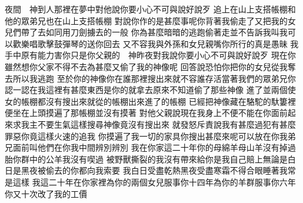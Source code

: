 夜間　神到人那裡\chientien 在夢中對他說\chientien 你要小心\chientien 不可與說好說歹\chuan 
{}追上\chientien{}在山上支搭帳棚\yuentien{}和他的眾弟兄\chientien 也在山上支搭帳棚\chuan 
{}對說\chientien 你作的是甚麼事呢\chientien 你背著我偷走了\chientien 又把我的女兒們帶了去\chientien 如同用刀劍擄去的一般\chuan 
{}你為甚麼暗暗的逃跑\chientien 偷著走\chientien 並不告訴我\chientien 叫我可以歡樂\chientien 唱歌\chientien 擊鼓\chientien 彈琴的送你回去\chuan 
{}又不容我與外孫和女兒親嘴\yuentien 你所行的真是愚昧\chuan 
{}我手中原有能力害你\chientien 只是你父親的　神昨夜對我說\chientien 你要小心\chientien 不可與說好說歹\chuan 
{}現在你雖然想你父家\chientien 不得不去\chientien 為甚麼又偷了我的神像呢\chuan{}
回答說\chientien 恐怕你把你的女兒從我奪去\chientien 所以我逃跑\chuan 
{}至於你的神像\chientien 你在誰那裡搜出來\chientien 就不容誰存活\yuentien 當著我們的眾弟兄你認一認\chientien 在我這裡有甚麼東西是你的\chientien 就拿去\chuan 原來不知道偷了那些神像\chuan\Chuan
{}進了\chientien{}\chientien 並兩個使女的帳棚\chientien 都沒有搜出來\yuentien 就從的帳棚出來\chientien 進了的帳棚\chuan 
{}已經把神像藏在駱駝的馱簍裡\chientien 便坐在上頭\chientien{}摸遍了那帳棚\chientien 並沒有摸著\chuan 
{}對他父親說\chientien 現在我身上不便\chientien 不能在你面前起來\chientien 求我主不要生氣\yuentien 這樣\chientien{}搜尋神像\chientien 竟沒有搜出來\chuan\Chuan
{}就發怒斥責說\chientien 我有甚麼過犯\chientien 有甚麼罪惡\chientien 你竟這樣火速的追我\chuan 
{}你摸遍了我一切的家具\chientien 你搜出甚麼來呢\chientien 可以放在你我弟兄面前\chientien 叫他們在你我中間辨別辨別\chuan 
{}我在你家這二十年\chientien 你的母綿羊\chientien 母山羊\chientien 沒有掉過胎\yuentien 你群中的公羊\chientien 我沒有喫過\yuentien 
{}被野獸撕裂的\chientien 我沒有帶來給你\chientien 是我自己賠上\chientien 無論是白日\chientien 是黑夜\chientien 被偷去的\chientien 你都向我索要\chuan 
{}我白日受盡乾熱\chientien 黑夜受盡寒霜\chientien 不得合眼睡著\chientien 我常是這樣\chuan 
{}我這二十年在你家裡\chientien 為你的兩個女兒服事你十四年\chientien 為你的羊群服事你六年\chientien 你又十次改了我的工價\chuan 
